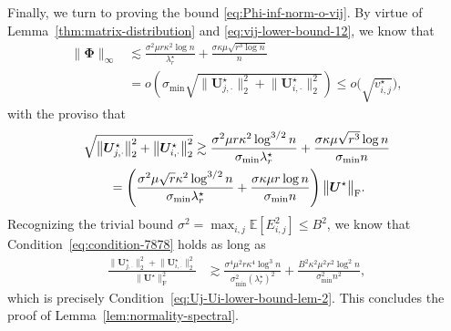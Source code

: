 Finally, we turn to proving the bound \eqref{eq:Phi-inf-norm-o-vij}. 
By virtue of Lemma~\ref{thm:matrix-distribution} and \eqref{eq:vij-lower-bound-12}, we know that 
%
\begin{align*}
\big\|\bm{\Phi}\big\|_{\infty} & \lesssim\frac{\sigma^{2}\mu r\kappa^{2}\log n}{\lambda_{r}^{\star}}+\frac{\sigma\kappa\mu\sqrt{r^{3}\log n}}{n}\\
 & =o\left(\sigma_{\min}\sqrt{\big\|\bm{U}_{j,\cdot}^{\star}\big\|_{2}^{2}+\big\|\bm{U}_{i,\cdot}^{\star}\big\|_{2}^{2}}\right)\leq o\big(\sqrt{v_{i,j}^{\star}}\big) , 
\end{align*}
%
with the proviso that
%
\begin{align}
	& \sqrt{\big\|\bm{U}_{j,\cdot}^{\star}\big\|_{2}^{2}+\big\|\bm{U}_{i,\cdot}^{\star}\big\|_{2}^{2}}  \gtrsim\frac{\sigma^{2}\mu r\kappa^{2}\log^{3/2}n}{\sigma_{\min}\lambda_{r}^{\star}}+\frac{\sigma\kappa\mu\sqrt{r^{3}}\log n}{\sigma_{\min}n} \notag\\
 & \qquad =\left(\frac{\sigma^{2}\mu\sqrt{r}\kappa^{2}\log^{3/2}n}{\sigma_{\min}\lambda_{r}^{\star}}+\frac{\sigma\kappa\mu r\log n}{\sigma_{\min}n}\right)\big\|\bm{U}^{\star}\big\|_{\mathrm{F}}. 
	\label{eq:condition-7878}
\end{align}
%
Recognizing the trivial bound $\sigma^2 = \max_{i,j}\mathbb{E}[E_{i,j}^2]\leq B^2$, we know that Condition~\eqref{eq:condition-7878} holds as long as
%
\begin{align}
	\frac{\big\|\bm{U}_{j,\cdot}^{\star}\big\|_{2}^{2}+\big\|\bm{U}_{i,\cdot}^{\star}\big\|_{2}^{2}}{\big\|\bm{U}^{\star}\big\|_{\mathrm{F}}^{2}}
	& \gtrsim \frac{\sigma^{4}\mu^{2}r\kappa^{4}\log^{3}n}{\sigma_{\min}^{2}(\lambda_{r}^{\star})^{2}} + \frac{B^{2}\kappa^2 \mu^{2}r^2\log ^2 n}{\sigma_{\min}^{2}n^{2}}, 
\end{align}
%
which is precisely Condition~\eqref{eq:Uj-Ui-lower-bound-lem-2}. This concludes the proof of Lemma~\ref{lem:normality-spectral}. 



%
%


